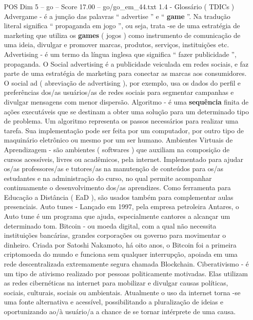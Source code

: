\begin{textsample}{POS Dim 5 – go – Score 17.00 – go/go\_em\_44.txt}  \label{ex:f5_pos_001}
1.4 - Glossário ( TDICs ) Advergame - é a junção das palavras “ advertise ” e “ \textbf{game} ”.
Na tradução literal significa “ propaganda em jogo ”, ou seja, trata -se de uma estratégia de marketing que utiliza os \textbf{games} ( jogos ) como instrumento de comunicação de uma ideia, divulgar e promover marcas, produtos, serviços, instituições etc.
Advertising - é um termo da língua inglesa que significa “ fazer publicidade ”, propaganda.
O Social advertising é a publicidade veiculada em redes sociais, e faz parte de uma estratégia de marketing para conectar as marcas aos consumidores.
O social ad ( abreviação de advertising ), por exemplo, usa os dados do perfil e preferências dos/as usuários/as de redes sociais para segmentar campanhas e divulgar mensagens com menor dispersão.
Algoritmo - é uma \textbf{sequência} finita de ações executáveis que se destinam a obter uma solução para um determinado tipo de problema.
Um algoritmo representa os passos necessários para realizar uma tarefa.
Sua implementação pode ser feita por um computador, por outro tipo de maquinário eletrônico ou mesmo por um ser humano.
Ambientes Virtuais de Aprendizagem - são ambientes ( softwares ) que auxiliam na composição de cursos acessíveis, livres ou acadêmicos, pela internet.
Implementado para ajudar os/as professores/as e tutores/as na manutenção de conteúdos para os/as estudantes e na administração do curso, no qual permite acompanhar continuamente o desenvolvimento dos/as aprendizes.
Como ferramenta para Educação a Distância ( EaD ), são usados também para complementar aulas presenciais.
Auto tunes - Lançado em 1997, pela empresa petroleira Antares, o Auto tune é um programa que ajuda, especialmente cantores a alcançar um determinado tom.
Bitcoin - ou moeda digital, com a qual não necessita instituições bancárias, grandes corporações ou governo para movimentar o dinheiro.
Criada por Satoshi Nakamoto, há oito anos, o Bitcoin foi a primeira criptomoeda do mundo e funciona sem qualquer interrupção, apoiada em uma rede descentralizada extremamente segura chamada Blockchain.
Ciberativismo - é um tipo de ativismo realizado por pessoas politicamente motivadas.
Elas utilizam as redes cibernéticas na internet para mobilizar e divulgar causas políticas, sociais, culturais, sociais ou ambientais.
Atualmente o uso da internet torna -se uma fonte alternativa e acessível, possibilitando a pluralização de ideias e oportunizando ao/à usuário/a a chance de se tornar intérprete de uma causa.

\end{textsample}
